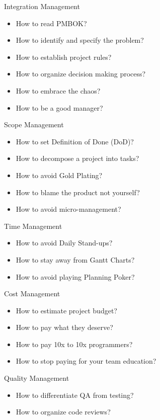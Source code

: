 \documentclass[nobrand,anonymous,nodate,nosecurity]{huawei}
\begin{document}
{
\begin{lectures}
\item Integration Management
    \begin{itemize}
    \item How to read PMBOK?
    \item How to identify and specify the problem?
    \item How to establish project rules?
    \item How to organize decision making process?
    \item How to embrace the chaos?
    \item How to be a good manager?
    \end{itemize}
\item Scope Management
    \begin{itemize}
    \item How to set Definition of Done (DoD)?
    \item How to decompose a project into tasks?
    \item How to avoid Gold Plating?
    \item How to blame the product not yourself?
    \item How to avoid micro-management?
    \end{itemize}
\item Time Management
    \begin{itemize}
    \item How to avoid Daily Stand-ups?
    \item How to stay away from Gantt Charts?
    \item How to avoid playing Planning Poker?
    \end{itemize}
\item Cost Management
    \begin{itemize}
    \item How to estimate project budget?
    \item How to pay what they deserve?
    \item How to pay 10x to 10x programmers?
    \item How to stop paying for your team education?
    \end{itemize}
\item Quality Management
    \begin{itemize}
    \item How to differentiate QA from testing?
    \item How to organize code reviews?

\end{itemize}
\end{lectures}}
\end{document}
